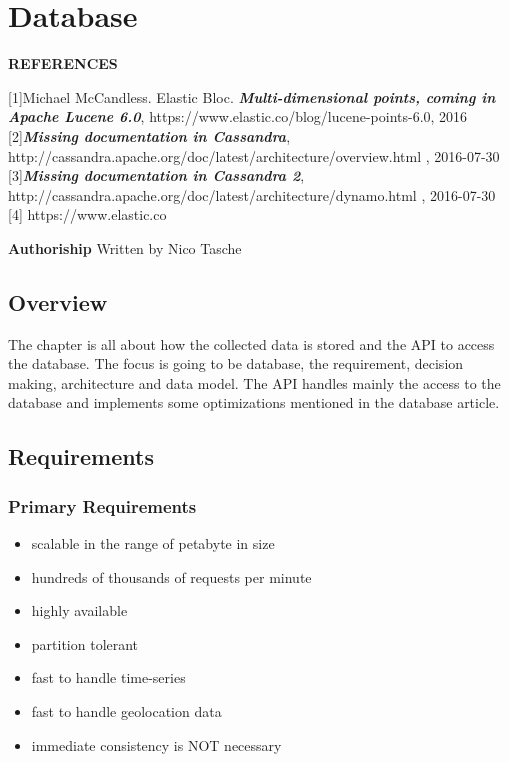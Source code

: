 \section{Database}\label{database}

\textbf{REFERENCES}

{[}1{]}Michael McCandless. Elastic Bloc. \textbf{\emph{Multi-dimensional
points, coming in Apache Lucene 6.0}},
https://www.elastic.co/blog/lucene-points-6.0, 2016
{[}2{]}\textbf{\emph{Missing documentation in Cassandra}},
http://cassandra.apache.org/doc/latest/architecture/overview.html ,
2016-07-30 {[}3{]}\textbf{\emph{Missing documentation in Cassandra 2}},
http://cassandra.apache.org/doc/latest/architecture/dynamo.html ,
2016-07-30 {[}4{]} https://www.elastic.co

\textbf{Authoriship} Written by Nico Tasche

\subsection{Overview}\label{overview}

The chapter is all about how the collected data is stored and the API to
access the database. The focus is going to be database, the requirement,
decision making, architecture and data model. The API handles mainly the
access to the database and implements some optimizations mentioned in
the database article.

\subsection{Requirements}\label{requirements}

\subsubsection{Primary Requirements}\label{primary-requirements}

\begin{itemize}
\tightlist
\item
  scalable in the range of petabyte in size
\item
  hundreds of thousands of requests per minute
\item
  highly available
\item
  partition tolerant
\item
  fast to handle time-series
\item
  fast to handle geolocation data
\item
  immediate consistency is NOT necessary
\end{itemize}

